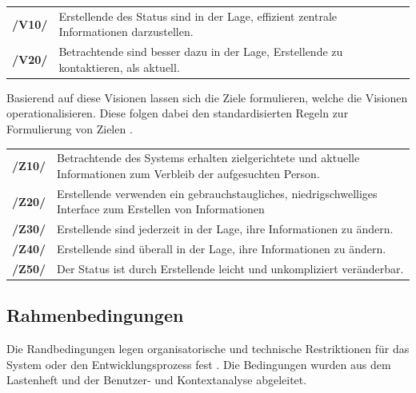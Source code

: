 \begin{center}
     \renewcommand{\arraystretch}{1.5}
    \begin{tabular}{p{}p{}}
    \hline
            \textbf{/V10/} & Erstellende des Status sind in der Lage, effizient zentrale
            Informationen darzustellen. \\
            \textbf{/V20/}  & Betrachtende sind besser dazu in der Lage, Erstellende zu
            kontaktieren, als aktuell.\\
    \hline
    \end{tabular}
\end{center}

Basierend auf diese Visionen lassen sich die Ziele formulieren, welche die Visionen
operationalisieren. Diese folgen dabei den standardisierten Regeln zur Formulierung von Zielen
\cite{pohl_requirements_2008}.


\begin{center}
     \renewcommand{\arraystretch}{1.5}
    \begin{tabular}{p{}p{}}
    \hline
            \textbf{/Z10/} & Betrachtende des Systems erhalten zielgerichtete und aktuelle
            Informationen zum Verbleib der aufgesuchten Person. \\
            \textbf{/Z20/} & Erstellende verwenden ein gebrauchstaugliches, niedrigschwelliges Interface zum Erstellen von Informationen\\
            \textbf{/Z30/} & Erstellende sind jederzeit in der Lage, ihre Informationen zu ändern.\\
            \textbf{/Z40/} & Erstellende sind überall in der Lage, ihre Informationen zu ändern.\\
            \textbf{/Z50/} & Der Status ist durch Erstellende leicht und unkompliziert veränderbar.\\
    \hline
    \end{tabular}
\end{center}

\subsection*{Rahmenbedingungen}
\label{section:rahmen}
Die Randbedingungen legen organisatorische und technische Restriktionen für das System oder den
Entwicklungsprozess fest \cite{balzert2009}. Die Bedingungen wurden aus dem Lastenheft und der
Benutzer- und Kontextanalyse abgeleitet.


